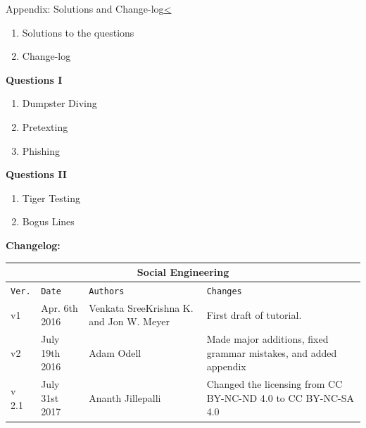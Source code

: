 \documentclass[12pt]{extarticle}
\newenvironment{instructionblock}{\Large\bgroup}{\egroup}
\newcommand{\ben}{\begin{enumerate}}
\newcommand{\een}{\end{enumerate}}
\begin{document}
\begin{slide}{Appendix: Solutions and Change-log}{\hyperref[slide 14]{\textless}}
	\begin{instructionblock}
		\begin{enumerate}
			\item {Solutions to the questions}
				
			\item {Change-log}
		\end{enumerate}
	\end{instructionblock}
\end{slide}

\textbf{Questions I}
\ben
	\item Dumpster Diving
	\item Pretexting
	\item Phishing 
\een

\textbf{Questions II}

\ben
	\item Tiger Testing
	\item Bogus Lines
\een

	
\textbf{Changelog:}
\label{changelog}
\vspace{6mm}


\begin{tabular}{ |p{1cm}|p{3cm}|p{3cm}|p{5cm}|  }
\hline
\multicolumn{4}{|c|}{Social Engineering} \\
\hline
\texttt{Ver.} & \texttt{Date} & \texttt{Authors} & \texttt{Changes} \\
\hline
v1 & Apr. 6th 2016 & Venkata SreeKrishna K. and Jon W. Meyer & First draft of tutorial. \\
\hline
v2 & July 19th 2016 & Adam Odell & Made major additions, fixed grammar mistakes, and added appendix \\
\hline
v 2.1 & July 31st 2017 & Ananth Jillepalli & Changed the licensing from CC BY-NC-ND 4.0 to CC BY-NC-SA 4.0 \\  \hline
\end{tabular}

\pagebreak

\end{document}
